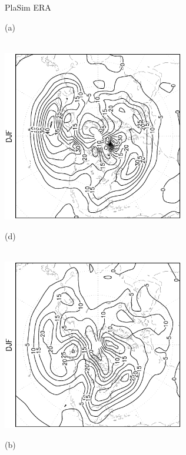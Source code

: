 \documentclass[12pt,a4paper,twoside,openright,headinclude,liststotoc,bibtotoc]{scrreprt}
\begin{document}
\begin{figure}[c]
\hspace{3.5cm}PlaSim \vspace{0.2cm} \hspace{7.3cm} ERA \\
\parbox{8.5cm}{\hspace{0.90cm}\begin{scriptsize}(a)\end{scriptsize} \vspace{-0.5cm} \\
\includegraphics[height=7.5cm,angle=-90]
{eps/PLDJF850fluxes_tr.eps}
}
\parbox{8.5cm}{\hspace{0.95cm}\begin{scriptsize}(d)\end{scriptsize} \vspace{-0.5cm} \\
\includegraphics[height=7.5cm,angle=-90]
{eps/ERADJF850fluxes_tr.eps}
}
\parbox{8.5cm}{\hspace{0.90cm}\begin{scriptsize}(b)\end{scriptsize} \vspace{-0.2cm} \\
}
\end{figure}
\end{document}
